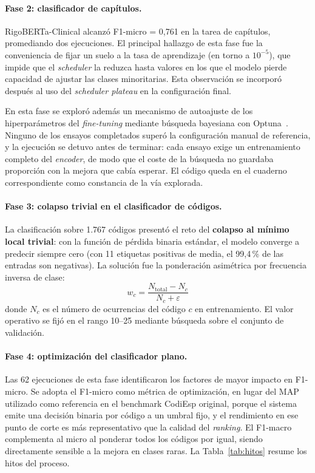 \paragraph{Fase 2: clasificador de capítulos.}
RigoBERTa-Clinical alcanzó F1-micro = 0,761 en la tarea de capítulos, promediando dos ejecuciones. El principal hallazgo de esta fase fue la conveniencia de fijar un suelo a la tasa de aprendizaje (en torno a $10^{-5}$), que impide que el \emph{scheduler} la reduzca hasta valores en los que el modelo pierde capacidad de ajustar las clases minoritarias. Esta observación se incorporó después al uso del \emph{scheduler plateau} en la configuración final.

En esta fase se exploró además un mecanismo de autoajuste de los hiperparámetros del \emph{fine-tuning} mediante búsqueda bayesiana con Optuna~\cite{akiba2019optuna}. Ninguno de los ensayos completados superó la configuración manual de referencia, y la ejecución se detuvo antes de terminar: cada ensayo exige un entrenamiento completo del \emph{encoder}, de modo que el coste de la búsqueda no guardaba proporción con la mejora que cabía esperar. El código queda en el cuaderno correspondiente como constancia de la vía explorada.

\paragraph{Fase 3: colapso trivial en el clasificador de códigos.}
La clasificación sobre 1.767 códigos presentó el reto del \textbf{colapso al mínimo local trivial}: con la función de pérdida binaria estándar, el modelo converge a predecir siempre cero (con 11 etiquetas positivas de media, el 99,4\,\% de las entradas son negativas). La solución fue la ponderación asimétrica por frecuencia inversa de clase:
\begin{equation}
w_c = \frac{N_{\text{total}} - N_c}{N_c + \varepsilon}
\end{equation}
donde $N_c$ es el número de ocurrencias del código $c$ en entrenamiento. El valor operativo se fijó en el rango 10–25 mediante búsqueda sobre el conjunto de validación.

\paragraph{Fase 4: optimización del clasificador plano.}
Las 62 ejecuciones de esta fase identificaron los factores de mayor impacto en F1-micro. Se adopta el F1-micro como métrica de optimización, en lugar del MAP utilizado como referencia en el benchmark CodiEsp original, porque el sistema emite una decisión binaria por código a un umbral fijo, y el rendimiento en ese punto de corte es más representativo que la calidad del \emph{ranking}. El F1-macro complementa al micro al ponderar todos los códigos por igual, siendo directamente sensible a la mejora en clases raras. La Tabla~\ref{tab:hitos} resume los hitos del proceso.

